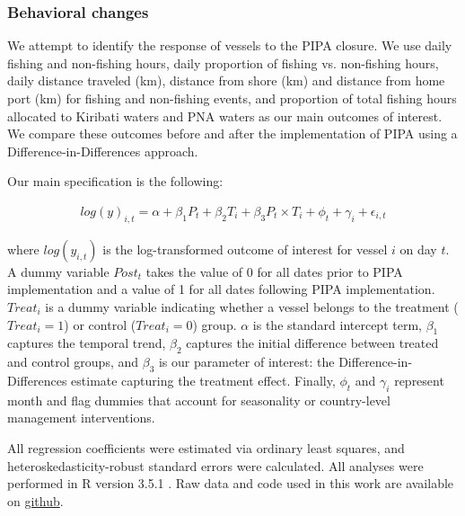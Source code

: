 \documentclass[9p,twocolumn,twoside,lineno]{pnas-new}
\begin{document}
\begin{scriptsize}
\subsubsection{Behavioral changes}

We attempt to identify the response of vessels to the PIPA closure. We use daily fishing and non-fishing hours, daily proportion of fishing vs. non-fishing hours, daily distance traveled (km), distance from shore (km) and distance from home port (km) for fishing and non-fishing events, and proportion of total fishing hours allocated to Kiribati waters and PNA waters as our main outcomes of interest. We compare these outcomes before and after the implementation of PIPA using a Difference-in-Differences approach. 

Our main specification is the following:

\begin{figure}[H]
\begin{align}
log(y)_{i,t} = \alpha + \beta_1 P_t + \beta_2 T_i + \beta_3 P_t \times T_i + \phi_t + \gamma_i + \epsilon_{i,t}
\label{eqn:did}
\end{align}
\end{figure}

\noindent where $log(y_{i,t})$ is the log-transformed outcome of interest for vessel $i$ on day $t$. A dummy variable $Post_t$ takes the value of 0 for all dates prior to PIPA implementation and a value of 1 for all dates following PIPA implementation. $Treat_i$ is a dummy variable indicating whether a vessel belongs to the treatment ($Treat_i = 1$) or control ($Treat_i = 0$) group. $\alpha$ is the standard intercept term, $\beta_1$ captures the temporal trend, $\beta_2$ captures the initial difference between treated and control groups, and $\beta_3$ is our parameter of interest: the Difference-in-Differences estimate capturing the treatment effect. Finally, $\phi_t$ and $\gamma_i$ represent month and flag dummies that account for seasonality or country-level management interventions. 

All regression coefficients were estimated via ordinary least squares, and heteroskedasticity-robust standard errors were calculated. All analyses were performed in R version 3.5.1 \citep{rcore_2018}. Raw data and code used in this work are available on \href{https://github.com/jcvdav/MPA_displacement}{github}.


\end{scriptsize}
\end{document}

